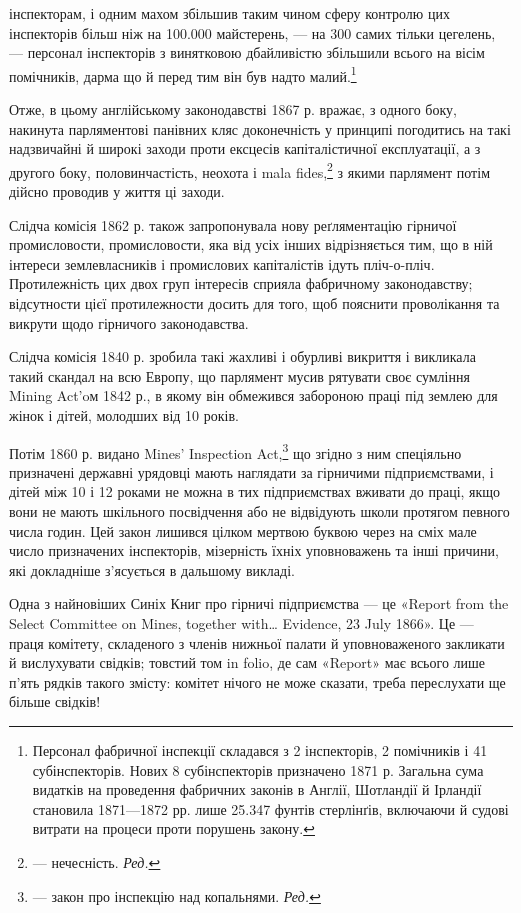 \parcont{}  %
інспекторам, і одним махом збільшив таким чином сферу контролю
цих інспекторів більш ніж на 100.000 майстерень, — на 300 самих
тільки цегелень, — персонал інспекторів з винятковою дбайливістю
збільшили всього на вісім помічників, дарма що й перед
тим він був надто малий.\footnote{
Персонал фабричної інспекції складався з 2 інспекторів, 2 помічників
і 41 субінспекторів. Нових 8 субінспекторів призначено 1871 р.
Загальна сума видатків на проведення фабричних законів в Англії,
Шотландії й Ірландії становила 1871—1872 рр. лише 25.347 фунтів стерлінґів,
включаючи й судові витрати на процеси проти порушень закону.
}

Отже, в цьому англійському законодавстві 1867 р. вражає,
з одного боку, накинута парляментові панівних кляс доконечність
у принципі погодитись на такі надзвичайні й широкі заходи
проти ексцесів капіталістичної експлуатації, а з другого боку,
половинчастість, неохота і mala fides,\footnote*{
— нечесність. \emph{Ред.}
} з якими парлямент
потім дійсно проводив у життя ці заходи.

Слідча комісія 1862 р. також запропонувала нову реґляментацію
гірничої промисловости, промисловости, яка від усіх інших
відрізняється тим, що в ній інтереси землевласників і промислових
капіталістів ідуть пліч-о-пліч. Протилежність цих двох
груп інтересів сприяла фабричному законодавству; відсутности
цієї протилежности досить для того, щоб пояснити проволікання
та викрути щодо гірничого законодавства.

Слідча комісія 1840 р. зробила такі жахливі і обурливі викриття
і викликала такий скандал на всю Европу, що парлямент
мусив рятувати своє сумління Mining Act’oм 1842 р., в якому
він обмежився забороною праці під землею для жінок і дітей,
молодших від 10 років.

Потім 1860 р. видано Mines’ Inspection Act,\footnote*{
— закон про інспекцію над копальнями. \emph{Ред.}
} що згідно з ним
спеціяльно призначені державні урядовці мають наглядати за гірничими
підприємствами, і дітей між 10 і 12 роками не можна в
тих підприємствах вживати до праці, якщо вони не мають шкільного
посвідчення або не відвідують школи протягом певного
числа годин. Цей закон лишився цілком мертвою буквою через
на сміх мале число призначених інспекторів, мізерність їхніх
уповноважень та інші причини, які докладніше з’ясується в
дальшому викладі.

Одна з найновіших Синіх Книг про гірничі підприємства —
це «Report from the Select Committee on Mines, together with\dots{}
Evidence, 23 July 1866». Це — праця комітету, складеного з
членів нижньої палати й уповноваженого закликати й вислухувати
свідків; товстий том in folio, де сам «Report» має всього
лише п’ять рядків такого змісту: комітет нічого не може сказати,
треба переслухати ще більше свідків!

